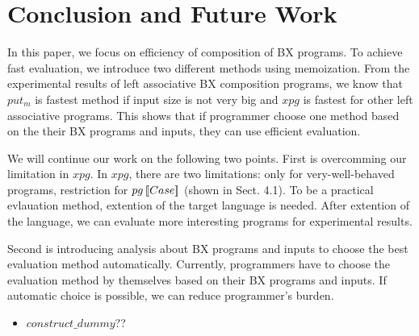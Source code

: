 \section{Conclusion and Future Work}

In this paper, we focus on efficiency of composition of BX programs.
To achieve fast evaluation, we introduce two different methods using memoization.
From the experimental results of left associative BX composition programs, we know that $put_m$ is fastest method if input size is not very big and $xpg$ is fastest for other left associative programs.
This shows that if programmer choose one method based on the their BX programs and inputs, they can use efficient evaluation. 


We will continue our work on the following two points.
First is overcomming our limitation in $xpg$. In $xpg$, there are two limitations: only for very-well-behaved programs, restriction for $pg \, [\![Case]\!]$ (shown in Sect. 4.1). To be a practical evlauation method, extention of the target language is needed. After extention of the language, we can evaluate more interesting programs for experimental results.

Second is introducing analysis about BX programs and inputs to choose the best evaluation method automatically.
Currently, programmers have to choose the evaluation method by themselves based on their BX programs and inputs. If automatic choice is possible, we can reduce programmer's burden.


\begin{itemize}
\item $construct\_dummy$??
\end{itemize}







